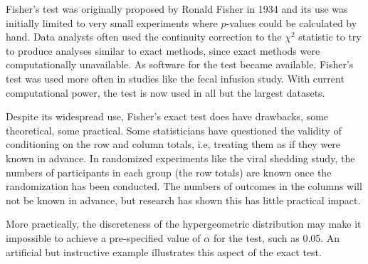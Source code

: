 Fisher's test was originally proposed by Ronald Fisher in 1934 and its use was initially limited to very small experiments where $p$-values could be calculated by hand.  Data analysts often used the continuity correction to the $\chi^2$ statistic to try to produce analyses similar to exact methods, since exact methods were computationally unavailable. As software for the test became available, Fisher's test was used more often in studies like the fecal infusion study.  With current computational power, the test is now used in all but the largest datasets.

Despite its widespread use, Fisher's exact test does have drawbacks, some theoretical, some practical.  Some statisticians have questioned the validity of conditioning on the row and column totals, i.e, treating them as if they were known in advance.  In randomized experiments like the viral shedding study, the numbers of participants in each group (the row totals) are known once the randomization has been conducted. The numbers of outcomes in the columns will not be known in advance, but research has shown this has little practical impact.

More practically, the discreteness of the hypergeometric distribution may make it impossible to achieve a pre-specified value of $\alpha$ for the test, such as 0.05.  An artificial but instructive example illustrates this aspect of the exact test.

